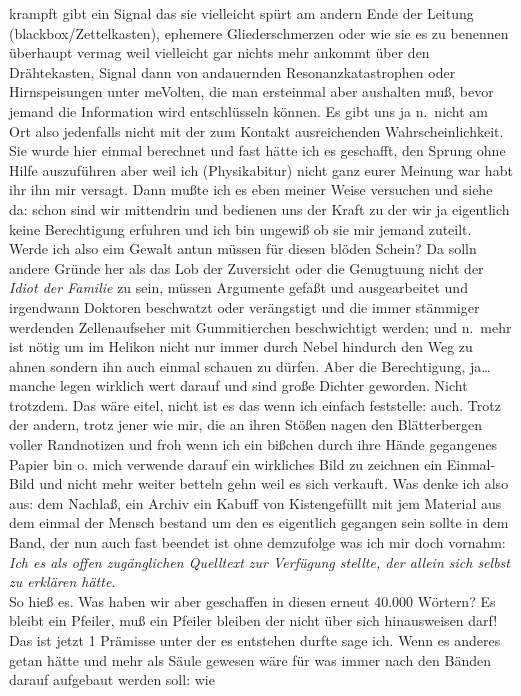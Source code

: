\documentclass[
]{article}
\begin{document}
krampft gibt ein Signal das sie vielleicht spürt am andern Ende der
Leitung (blackbox/Zettelkasten), ephemere Gliederschmerzen oder wie sie
es zu benennen überhaupt vermag weil vielleicht gar nichts mehr ankommt
über den Drähtekasten, Signal dann von andauernden Resonanzkatastrophen
oder Hirnspeisungen unter meVolten, die man ersteinmal aber aushalten
muß, bevor jemand die Information wird entschlüsseln können. Es gibt uns
ja n.~nicht am Ort also jedenfalls nicht mit der zum Kontakt
ausreichenden Wahrscheinlichkeit. Sie wurde hier einmal berechnet und
fast hätte ich es geschafft, den Sprung ohne Hilfe auszuführen aber weil
ich (Physikabitur) nicht ganz eurer Meinung war habt ihr ihn mir
versagt. Dann mußte ich es eben meiner Weise versuchen und siehe da:
schon sind wir mittendrin und bedienen uns der Kraft zu der wir ja
eigentlich keine Berechtigung erfuhren und ich bin ungewiß ob sie mir
jemand zuteilt. Werde ich also eim Gewalt antun müssen für diesen blöden
Schein? Da solln andere Gründe her als das Lob der Zuversicht oder die
Genugtuung nicht der \emph{Idiot der Familie} zu sein, müssen Argumente
gefaßt und ausgearbeitet und irgendwann Doktoren beschwatzt oder
verängstigt und die immer stämmiger werdenden Zellenaufseher mit
Gummitierchen beschwichtigt werden; und n.~mehr ist nötig um im Helikon
nicht nur immer durch Nebel hindurch den Weg zu ahnen sondern ihn auch
einmal schauen zu dürfen. Aber die Berechtigung, ja\ldots{} manche legen
wirklich wert darauf und sind große Dichter geworden. Nicht trotzdem.
Das wäre eitel, nicht ist es das wenn ich einfach feststelle: auch.
Trotz der andern, trotz jener wie mir, die an ihren Stößen nagen den
Blätterbergen voller Randnotizen und froh wenn ich ein bißchen durch
ihre Hände gegangenes Papier bin o. mich verwende darauf ein wirkliches
Bild zu zeichnen ein Einmal-Bild und nicht mehr weiter betteln gehn weil
es sich verkauft. Was denke ich also aus: dem Nachlaß, ein Archiv ein
Kabuff von Kistengefüllt mit jem Material aus dem einmal der Mensch
bestand um den es eigentlich gegangen sein sollte in dem Band, der nun
auch fast beendet ist ohne demzufolge was ich mir doch vornahm:
\emph{Ich es als offen zugänglichen Quelltext zur Verfügung stellte, der
allein sich selbst zu erklären hätte.}\\
So hieß es. Was haben wir aber geschaffen in diesen erneut 40.000
Wörtern? Es bleibt ein Pfeiler, muß ein Pfeiler bleiben der nicht über
sich hinausweisen darf! Das ist jetzt 1 Prämisse unter der es entstehen
durfte sage ich. Wenn es anderes getan hätte und mehr als Säule gewesen
wäre für was immer nach den Bänden darauf aufgebaut werden soll: wie
\end{document}

